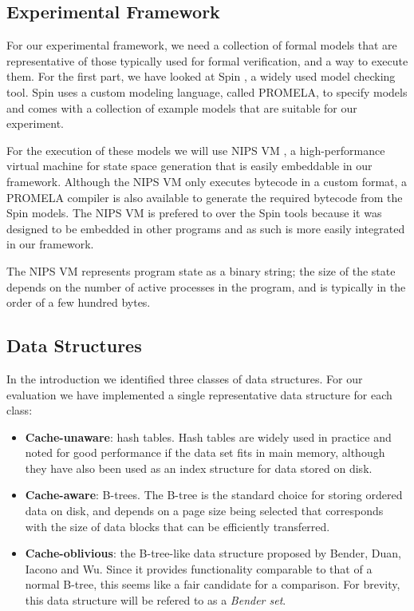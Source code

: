 \documentclass{acm_proc_article-sp}
\begin{document}
\subsection{Experimental Framework}


For our experimental framework, we need a collection of formal models that are
representative of those typically used for formal verification, and a way to
execute them. For the first part, we have looked at Spin \cite{spin}, a widely
used model checking tool. Spin uses a custom modeling language, called
PROMELA, to specify models and comes with a collection of example models that
are suitable for our experiment.

For the execution of these models we will use NIPS VM \cite{weber2007evm}, a
high-performance virtual machine for state space generation that is easily
embeddable in our framework. Although the NIPS VM only executes bytecode in a
custom format, a PROMELA compiler is also available to generate the required
bytecode from the Spin models.\cite{nipsvm} The NIPS VM is prefered to over the
Spin tools because it was designed to be embedded in other programs and as
such is more easily integrated in our framework.

The NIPS VM represents program state as a binary string; the size of the state
depends on the number of active processes in the program, and is typically in
the order of a few hundred bytes.

\subsection{Data Structures}
In the introduction we identified three classes of data structures.
For our evaluation we have implemented a single representative data structure
for each class:
\begin{itemize}
\item \textbf{Cache-unaware}: hash tables. Hash tables are widely used in practice and noted for good performance if the data set fits in main memory, although they have also been used as an index structure for data stored on disk.
\item \textbf{Cache-aware}: B-trees. The B-tree is the standard choice for storing ordered data on disk, and depends on a page size being selected that corresponds with the size of data blocks that can be efficiently transferred.
\item \textbf{Cache-oblivious}: the B-tree-like data structure proposed by Bender, Duan, Iacono and Wu. Since it provides functionality comparable to that of a normal B-tree, this seems like a fair candidate for a comparison. For brevity, this data structure will be refered to as a \emph{Bender set}.
\end{itemize}
\end{document}
